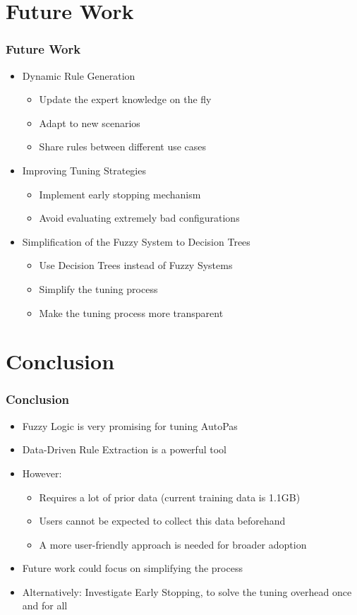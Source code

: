 \documentclass[
	10pt,
	t		%
]{beamer}
\begin{document}
\section{Future Work}
\begin{frame}
	\frametitle{Future Work}
	\begin{itemize}
		\item Dynamic Rule Generation
		      \begin{itemize}
			      \item Update the expert knowledge on the fly
			      \item Adapt to new scenarios
			      \item Share rules between different use cases
		      \end{itemize}
		\item Improving Tuning Strategies
		      \begin{itemize}
			      \item Implement early stopping mechanism
			      \item Avoid evaluating extremely bad configurations
		      \end{itemize}
		\item Simplification of the Fuzzy System to Decision Trees
		      \begin{itemize}
			      \item Use Decision Trees instead of Fuzzy Systems
			      \item Simplify the tuning process
			      \item Make the tuning process more transparent
		      \end{itemize}
	\end{itemize}
\end{frame}


\section{Conclusion}
\begin{frame}
	\frametitle{Conclusion}
	\begin{itemize}
		\item Fuzzy Logic is very promising for tuning AutoPas
		\item Data-Driven Rule Extraction is a powerful tool
		\item However:
		      \begin{itemize}
			      \item Requires a lot of  prior data (current training data is 1.1GB)
			      \item Users cannot be expected to collect this data beforehand
			      \item A more user-friendly approach is needed for broader adoption
		      \end{itemize}
		\item Future work could focus on simplifying the process
		\item Alternatively: Investigate Early Stopping, to solve the tuning overhead once and for all
	\end{itemize}
\end{frame}
\end{document}
